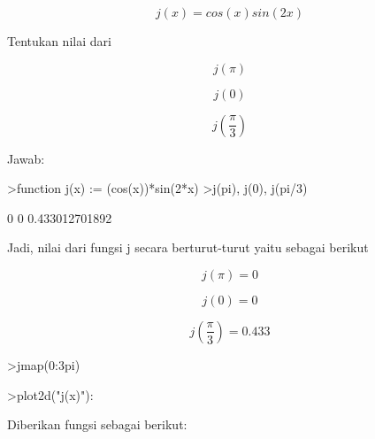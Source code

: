 \documentclass{article}
\begin{document}
\begin{eulernotebook}
\begin{eulercomment}
\end{eulercomment}
\begin{eulerformula}
\[
j(x)= cos(x)sin(2x)
\]
\end{eulerformula}
\begin{eulercomment}
Tentukan nilai dari\\
\end{eulercomment}
\begin{eulerformula}
\[
j(\pi)
\]
\end{eulerformula}
\begin{eulerformula}
\[
j(0)
\]
\end{eulerformula}
\begin{eulerformula}
\[
j(\frac {\pi}{3})
\]
\end{eulerformula}
\begin{eulercomment}
Jawab:
\end{eulercomment}
\begin{eulerprompt}
>function j(x) := (cos(x))*sin(2*x)
>j(pi), j(0), j(pi/3)
\end{eulerprompt}
\begin{euleroutput}
  0
  0
  0.433012701892
\end{euleroutput}
\begin{eulercomment}
Jadi, nilai dari fungsi j secara berturut-turut yaitu sebagai berikut\\
\end{eulercomment}
\begin{eulerformula}
\[
j(\pi) = 0
\]
\end{eulerformula}
\begin{eulerformula}
\[
j(0) = 0
\]
\end{eulerformula}
\begin{eulerformula}
\[
j(\frac{\pi}{3}) = 0.433
\]
\end{eulerformula}
\begin{eulerprompt}
>jmap(0:3pi)
\end{eulerprompt}
\begin{euleroutput}
  [0,  0.491295,  0.314941,  0.276619,  -0.646688,  -0.154318,
  -0.515201,  0.746821,  0.0418899,  0.684247]
\end{euleroutput}
\begin{eulerprompt}
>plot2d("j(x)"):
\end{eulerprompt}
\begin{eulercomment}
\end{eulercomment}
\eulersubheading{}
\begin{eulercomment}
Diberikan fungsi sebagai berikut:


\end{eulercomment}
\end{eulernotebook}
\end{document}
